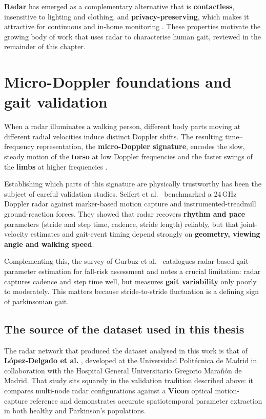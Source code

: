 \textbf{Radar} has emerged as a complementary alternative that is
\textbf{contactless}, insensitive to lighting and clothing, and
\textbf{privacy-preserving}, which makes it attractive for continuous and in-home
monitoring \cite{seifert2020,gurbuz2024,alanazi2022}. These properties motivate
the growing body of work that uses radar to characterise human gait, reviewed in
the remainder of this chapter.

\section{Micro-Doppler foundations and gait validation}
\label{sec:foundations}

When a radar illuminates a walking person, different body parts moving at
different radial velocities induce distinct Doppler shifts. The resulting
time--frequency representation, the \textbf{micro-Doppler signature}, encodes the
slow, steady motion of the \textbf{torso} at low Doppler frequencies and the
faster swings of the \textbf{limbs} at higher frequencies \cite{seifert2020}.

Establishing which parts of this signature are physically trustworthy has been
the subject of careful validation studies. Seifert et al.\ \cite{seifert2020}
benchmarked a 24\,GHz Doppler radar against marker-based motion capture and
instrumented-treadmill ground-reaction forces. They showed that radar recovers
\textbf{rhythm and pace} parameters (stride and step time, cadence, stride
length) reliably, but that joint-velocity estimates and gait-event timing depend
strongly on \textbf{geometry, viewing angle and walking speed}.

Complementing this, the survey of Gurbuz et al.\ \cite{gurbuz2024} catalogues
radar-based gait-parameter estimation for fall-risk assessment and notes a
crucial limitation: radar captures cadence and step time well, but measures
\textbf{gait variability} only poorly to moderately. This matters because
stride-to-stride fluctuation is a defining sign of parkinsonian gait.

\subsection{The source of the dataset used in this thesis}
\label{sec:dataset-origin}

The radar network that produced the dataset analysed in this work is that of
\textbf{López-Delgado et al.} \cite{lopezdelgado2026}, developed at the
Universidad Politécnica de Madrid in collaboration with the Hospital General
Universitario Gregorio Marañón de Madrid. That study sits squarely in the validation
tradition described above: it compares multi-node radar configurations against a
\textbf{Vicon} optical motion-capture reference \cite{merriaux2017} and
demonstrates accurate spatiotemporal
parameter extraction in both healthy and Parkinson's populations.

